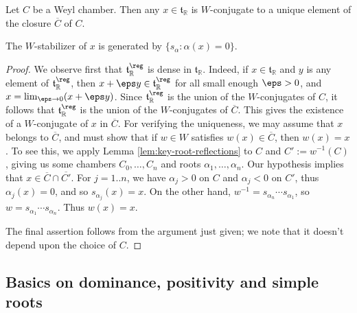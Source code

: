 \documentclass[reqno]{amsart} 
\begin{document}
\begin{corollary}\label{cor:W-conj-to-unique-dominant-element}
  Let $C$ be a Weyl chamber.  Then any $x \in \mathfrak{t}_{\mathbb{R}}$ is $W$-conjugate to a unique element of the closure $\overline{C}$ of $C$.

  The $W$-stabilizer of $x$ is generated by $\{s_\alpha : \alpha(x) = 0\}$.
\end{corollary}
\begin{proof}
  We observe first that $\mathfrak{t}_{\mathbb{R}}^{\reg}$ is dense in $\mathfrak{t}_{\mathbb{R}}$.  Indeed, if $x \in \mathfrak{t}_{\mathbb{R}}$ and $y$ is any element of $\mathfrak{t}_{\mathbb{R}}^{\reg}$, then $x + \eps y \in \mathfrak{t}_{\mathbb{R}}^{\reg}$ for all small enough $\eps > 0$, and $x = \lim_{\eps \rightarrow 0} (x + \eps y)$.  Since $\mathfrak{t}_{\mathbb{R}}^{\reg}$ is the union of the $W$-conjugates of $C$, it follows that $\mathfrak{t}_{\mathbb{R}}^{\reg}$ is the union of the $W$-conjugates of $\overline{C}$.  This gives the existence of a $W$-conjugate of $x$ in $\overline{C}$.  For verifying the uniqueness, we may assume that $x$ belongs to $\overline{C}$, and must show that if $w \in W$ satisfies $w(x) \in \overline{C}$, then $w(x) = x$.  To see this, we apply Lemma \ref{lem:key-root-reflections} to $C$ and $C' := w^{-1}(C)$, giving us some chambers $C_0,\dotsc,C_n$ and roots $\alpha_1,\dotsc,\alpha_n$.  Our hypothesis implies that $x \in \overline{C} \cap \overline{C'}$.  For $j = 1..n$, we have $\alpha_j > 0$ on $C$ and $\alpha_j < 0$ on $C'$, thus $\alpha_j(x) = 0$, and so $s_{\alpha_j}(x) = x$.  On the other hand, $w^{-1} = s_{\alpha_n} \dotsb s_{\alpha_1}$, so $w = s_{\alpha_1} \dotsb s_{\alpha_n}$.  Thus $w(x) = x$.

  The final assertion follows from the argument just given; we note that it doesn't depend upon the choice of $C$.
\end{proof}

\subsection{Basics on dominance, positivity and simple roots}\label{sec:cnh2vowwm5}
\end{document}
